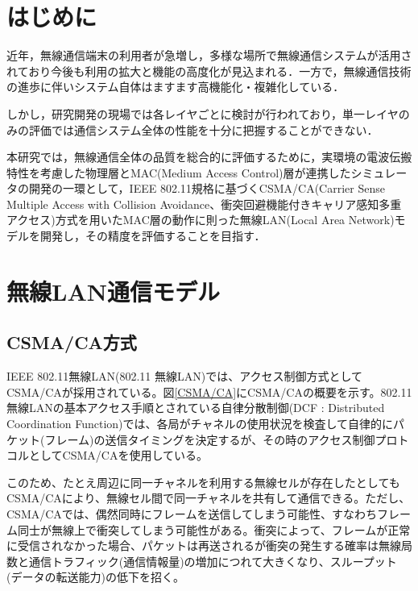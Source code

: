 \documentclass[a4paper,10pt]{ltjsarticle}
\begin{document}

\tableofcontents
\thispagestyle{empty}



\clearpage
\setcounter{page}{1}

\section{はじめに}

近年，無線通信端末の利用者が急増し，多様な場所で無線通信システムが活用されており今後も利用の拡大と機能の高度化が見込まれる．一方で，無線通信技術の進歩に伴いシステム自体はますます高機能化・複雑化している．

しかし，研究開発の現場では各レイヤごとに検討が行われており，単一レイヤのみの評価では通信システム全体の性能を十分に把握することができない．

本研究では，無線通信全体の品質を総合的に評価するために，実環境の電波伝搬特性を考慮した物理層とMAC(Medium Access Control)層が連携したシミュレータの開発の一環として，IEEE 802.11規格に基づくCSMA/CA(Carrier Sense Multiple Access with Collision Avoidance、衝突回避機能付きキャリア感知多重アクセス)方式を用いたMAC層の動作に則った無線LAN(Local Area Network)モデルを開発し，その精度を評価することを目指す．


\clearpage
\section{無線LAN通信モデル}

\subsection{CSMA/CA方式}


IEEE 802.11無線LAN(802.11 無線LAN)では、アクセス制御方式としてCSMA/CAが採用されている。図\ref{CSMA/CA}にCSMA/CAの概要を示す。802.11 無線LANの基本アクセス手順とされている自律分散制御(DCF : Distributed Coordination Function)では、各局がチャネルの使用状況を検査して自律的にパケット(フレーム)の送信タイミングを決定するが、その時のアクセス制御プロトコルとしてCSMA/CAを使用している。

このため、たとえ周辺に同一チャネルを利用する無線セルが存在したとしてもCSMA/CAにより、無線セル間で同一チャネルを共有して通信できる。ただし、CSMA/CAでは、偶然同時にフレームを送信してしまう可能性、すなわちフレーム同士が無線上で衝突してしまう可能性がある。衝突によって、フレームが正常に受信されなかった場合、パケットは再送されるが衝突の発生する確率は無線局数と通信トラフィック(通信情報量)の増加につれて大きくなり、スループット(データの転送能力)の低下を招く。
\end{document}
